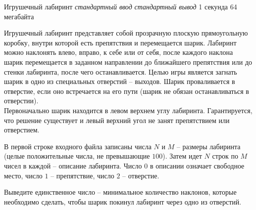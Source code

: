 \begin{problem}%
{Игрушечный лабиринт}%
{\textsl{стандартный ввод}}%
{\textsl{стандартный вывод}}%
{1 секунда}%
{64 мегабайта}%
{}

Игрушечный лабиринт представляет собой прозрачную плоскую прямоугольную коробку, внутри которой есть препятствия и перемещается шарик. Лабиринт можно наклонять влево, вправо, к себе или от себя, после каждого наклона шарик перемещается в заданном направлении до ближайшего препятствия или до стенки лабиринта, после чего останавливается. Целью игры является загнать шарик в одно из специальных отверстий – выходов. Шарик проваливается в отверстие, если оно встречается на его пути (шарик не обязан останавливаться в отверстии). \\

Первоначально шарик находится в левом верхнем углу лабиринта. Гарантируется, что решение существует и левый верхний угол не занят препятствием или отверстием.

\InputFile

В первой строке входного файла записаны числа $N$ и $M$ – размеры лабиринта (целые положительные числа, не превышающие $100$). Затем идет $N$ строк по $M$ чисел в каждой – описание лабиринта. Число $0$ в описании означает свободное место, число $1$ – препятствие, число $2$ – отверстие.

\OutputFile

Выведите единственное число – минимальное количество наклонов, которые необходимо сделать, чтобы шарик покинул лабиринт через одно из отверстий.

\Examples

\begin{example}
%
\end{example}
\end{problem}
